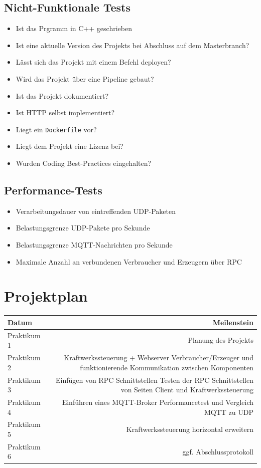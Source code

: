 \documentclass[
    fontsize=12pt,
    parskip=half
]{scrartcl}
\begin{document}
\subsection{Nicht-Funktionale Tests}
    \begin{itemize}
        \item Ist das Prgramm in C++ geschrieben
        \item Ist eine aktuelle Version des Projekts bei Abschluss auf dem Masterbranch?
        \item Lässt sich das Projekt mit einem Befehl deployen?
        \item Wird das Projekt über eine Pipeline gebaut?
        \item Ist das Projekt dokumentiert?
        \item Ist HTTP selbst implementiert?
        \item Liegt ein \texttt{Dockerfile} vor?
        \item Liegt dem Projekt eine Lizenz bei?
        \item Wurden Coding Best-Practices eingehalten?
    \end{itemize}

\subsection{Performance-Tests}
\begin{itemize}
    \item Verarbeitungsdauer von eintreffenden UDP-Paketen
    \item Belastungsgrenze UDP-Pakete pro Sekunde
    \item Belastungsgrenze MQTT-Nachrichten pro Sekunde
    \item Maximale Anzahl an verbundenen Verbraucher und Erzeugern über RPC
\end{itemize}

\section{Projektplan}
\begin{tabularx}{\textwidth}{|l|R|}
\hline
\textbf{Datum} & \textbf{Meilenstein} \\
\hline
Praktikum 1 & Planung des Projekts \\
\hline
Praktikum 2 & Kraftwerkssteuerung + Webserver\linebreak
    Verbraucher/Erzeuger und\linebreak
    funktionierende Kommunikation zwischen Komponenten \\
\hline
Praktikum 3 & 
    Einfügen von RPC Schnittstellen\linebreak
    Testen der RPC Schnittstellen von Seiten Client und Kraftwerkssteuerung \\
\hline
Praktikum 4 & 
    Einführen eines MQTT-Broker\linebreak
    Performancetest und Vergleich MQTT zu UDP \\
\hline
Praktikum 5 & 
    Kraftwerkssteuerung horizontal erweitern \\
\hline
Praktikum 6 &
    ggf. Abschlussprotokoll \\
\hline
\end{tabularx}
\end{document}
